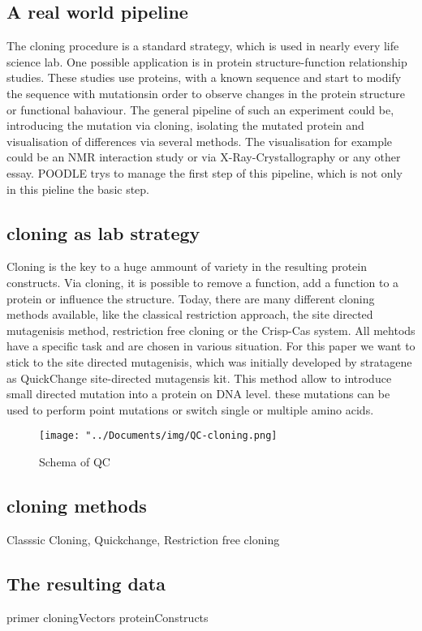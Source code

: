 \documentclass{bioinfo}
\begin{document}
\subsection{A real world pipeline}
The cloning procedure is a standard strategy, which is used in nearly every life science lab. One possible application is in protein structure-function relationship studies. These studies use proteins, with a known sequence and start to modify the sequence with mutationsin order to observe changes  in the protein structure or functional bahaviour. The general pipeline of such an experiment could be, introducing the mutation via cloning, isolating the mutated protein and visualisation of differences via several methods. The visualisation for example could be an NMR interaction study or via X-Ray-Crystallography or any other essay. POODLE trys to manage the first  step of this pipeline, which is not only in this pieline the basic step.
\subsection{cloning as lab strategy}
Cloning is the key to a huge ammount of variety in the resulting protein constructs. Via cloning, it is possible to remove a function, add a function to a protein or influence the structure. Today, there are many different cloning methods available, like the classical restriction approach, the site directed mutagenisis method, restriction free cloning or the Crisp-Cas system. All mehtods have a specific task and are chosen in various situation. For this paper we want to stick to the site directed mutagenisis, which was initially developed by stratagene as QuickChange site-directed mutagensis kit. This method allow to introduce small directed mutation into a protein on DNA level. these mutations can be used to perform point mutations or switch single or multiple amino acids.

\begin{figure}
	\texttt{[image: "../Documents/img/QC-cloning.png]}
	\caption{Schema of QC}
	\label{QC-pic}
\end{figure}

\subsection{cloning methods}
Classsic Cloning, Quickchange, Restriction free cloning

\subsection{The resulting data}
primer
cloningVectors
proteinConstructs
\end{document}
